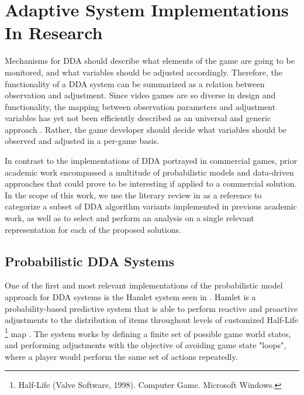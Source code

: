 
\section{Adaptive System Implementations In Research}

Mechanisms for DDA should describe what elements of the game are going to be monitored, and what variables should be adjusted accordingly. Therefore, the functionality of a DDA system can be summarized as a relation between observation and adjustment. Since video games are so diverse in design and functionality, the mapping between observation parameters and adjustment variables has yet not been efficiently described as an universal and generic approach \cite{PHD_DynamicDifficultyAdjustment}. Rather, the game developer should decide what variables should be observed and adjusted in a per-game basis.

In contrast to the implementations of DDA portrayed in commercial games, prior academic work encompassed a multitude of probabilistic models and data-driven approaches that could prove to be interesting if applied to a commercial solution. In the scope of this work, we use the literary review in \cite{article_ddareview} as a reference to categorize a subset of DDA algorithm variants implemented in previous academic work, as well as to select and perform an analysis on a single relevant representation for each of the proposed solutions.


\subsection{Probabilistic DDA Systems}
\label{sec:statistical-adjustments}

One of the first and most relevant implementations of the probabilistic model approach for DDA systems is the Hamlet system seen in \cite{article_casefordynamicdifficulty}. Hamlet is a probability-based predictive system that is able to perform reactive and proactive adjustments to the distribution of items throughout levels of customized Half-Life \footnote{Half-Life (Valve Software, 1998). Computer Game. Microsoft Windows.} map \cite{article_casefordynamicdifficulty}. The system works by defining a finite set of possible game world states, and performing adjustments with the objective of avoiding game state "loops", where a player would perform the same set of actions repeatedly.

